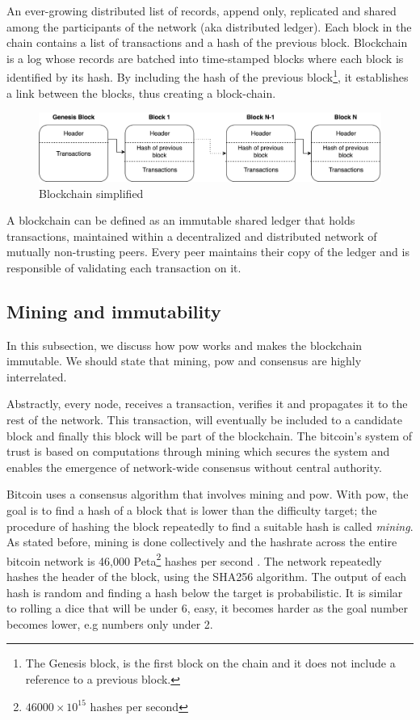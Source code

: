 An ever-growing distributed list of records, append only, replicated and shared among the participants of the network (aka distributed ledger). Each block in the chain contains a list of transactions and a hash of the previous block. Blockchain is a log whose records are batched into time-stamped blocks where each block is identified by its hash. By including the hash of the previous block\footnote{The Genesis block, is the first block on the chain and it does not include a reference to a previous block.}, it establishes a link between the blocks, thus creating a block-chain. 
	\begin{figure}[H]
	    \centering
	    \includegraphics[width=1\textwidth]{images/blockchain_simplified.png}
	    \caption{Blockchain simplified}
	    \label{fig:block_simpl}
	\end{figure}
A blockchain can be defined as an immutable shared ledger that holds transactions, maintained within a decentralized and distributed network of mutually non-trusting peers. Every peer maintains their copy of the ledger and is responsible of validating each transaction on it.

\subsection{Mining and immutability}
In this subsection, we discuss how \acrshort{pow} works and makes the blockchain immutable. We should state that mining, \acrshort{pow} and consensus are highly interrelated. 

Abstractly, every node, receives a transaction, verifies it and propagates it to the rest of the network. This transaction, will eventually be included to a candidate block and finally this block will be part of the blockchain. The bitcoin's system of trust is based on computations through mining which secures the system and enables the emergence of network-wide consensus without central authority. 

Bitcoin uses a consensus algorithm that involves mining and \acrshort{pow}. With \acrshort{pow}, the goal is to find a hash of a block that is lower than the difficulty target; the procedure of hashing the block repeatedly to find a suitable hash is called \textit{mining}. As stated before, mining is done collectively and the hashrate across the entire bitcoin network is 46,000 Peta\footnote{$46000 \times 10^{15}$ hashes per second} hashes per second \cite{btc-hashrate}. The network repeatedly hashes the header of the block, using the SHA256 algorithm. The output of each hash is random and finding a hash below the target is probabilistic. It is similar to rolling a dice that will be under 6, easy, it becomes harder as the goal number becomes lower, e.g numbers only under 2.

